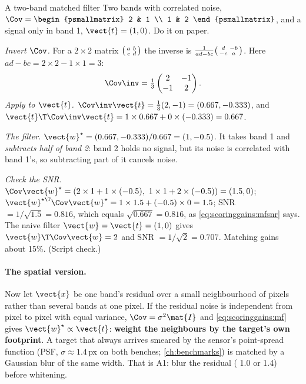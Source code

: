 \begin{worked}[label={we:scoringgains:mf2}]{A two-band matched filter}
Two bands with correlated noise, $\Cov = \begin{psmallmatrix} 2 & 1 \\ 1 & 2 \end{psmallmatrix}$, and a signal only in band
1, $\vect{t} = (1, 0)$. Do it on paper.

\emph{Invert $\Cov$.} For a $2 \times 2$ matrix $\begin{psmallmatrix} a & b \\ c & d\end{psmallmatrix}$ the inverse is
$\frac{1}{ad - bc}\begin{psmallmatrix} d & -b \\ -c & a\end{psmallmatrix}$. Here $ad - bc = 2 \times 2 - 1 \times 1 = 3$:
\[
\Cov\inv = \tfrac13 \begin{pmatrix} 2 & -1 \\ -1 & 2 \end{pmatrix}.
\]
\emph{Apply to $\vect{t}$.} $\Cov\inv\vect{t} = \tfrac13 (2, -1) = (0.667, -0.333)$, and
$\vect{t}\T\Cov\inv\vect{t} = 1 \times 0.667 + 0 \times (-0.333) = 0.667$.

\emph{The filter.} $\vect{w}^\star = (0.667, -0.333) / 0.667 = (1, -0.5)$. It takes band 1 and \emph{subtracts half of band
2}: band 2 holds no signal, but its noise is correlated with band 1's, so subtracting part of it cancels noise.

\emph{Check the SNR.} $\Cov\vect{w}^\star = (2 \times 1 + 1 \times (-0.5),\ 1 \times 1 + 2 \times (-0.5)) = (1.5, 0)$;
$\vect{w}^{\star\T}\Cov\vect{w}^\star = 1 \times 1.5 + (-0.5) \times 0 = 1.5$; SNR $= 1 / \sqrt{1.5} = 0.816$, which equals
$\sqrt{0.667} = 0.816$, as \eqref{eq:scoringgains:mfsnr} says. The naive filter $\vect{w} = \vect{t} = (1, 0)$ gives
$\vect{w}\T\Cov\vect{w} = 2$ and SNR $= 1/\sqrt{2} = 0.707$. Matching gains about 15\%. (Script check\tagC.)
\end{worked}

\paragraph{The spatial version.} Now let $\vect{x}$ be one band's residual over a small neighbourhood of pixels rather than
several bands at one pixel. If the residual noise is independent from pixel to pixel with equal variance, $\Cov = \sigma^2
\mat{I}$ and \eqref{eq:scoringgains:mf} gives $\vect{w}^\star \propto \vect{t}$: \textbf{weight the neighbours by the
target's own footprint}. A target that always arrives smeared by the sensor's point-spread function (PSF, $\sigma \approx
1.4$\,px on both benches; \cref{ch:benchmarks}) is matched by a Gaussian blur of the same width. That is A1: blur the
residual ( 1.0 or 1.4) before whitening.

